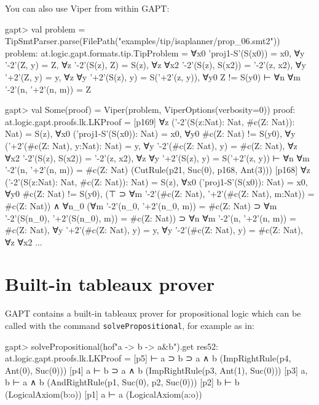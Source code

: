 \documentclass[a4paper,11pt]{book}
\begin{document}
You can also use Viper from within GAPT:
\begin{clilisting}
gapt> val problem = TipSmtParser.parse(FilePath("examples/tip/isaplanner/prop_06.smt2"))
problem: at.logic.gapt.formats.tip.TipProblem =
∀x0 'proj1-S'(S(x0)) = x0,
∀y '-2'(Z, y) = Z,
∀z '-2'(S(z), Z) = S(z),
∀z ∀x2 '-2'(S(z), S(x2)) = '-2'(z, x2),
∀y '+2'(Z, y) = y,
∀z ∀y '+2'(S(z), y) = S('+2'(z, y)),
∀y0 Z != S(y0)
⊢
∀n ∀m '-2'(n, '+2'(n, m)) = Z

gapt> val Some(proof) = Viper(problem, ViperOptions(verbosity=0))
proof: at.logic.gapt.proofs.lk.LKProof =
[p169] ∀z ('-2'(S(z:Nat): Nat, #c(Z: Nat)): Nat) = S(z),
∀x0 ('proj1-S'(S(x0)): Nat) = x0,
∀y0 #c(Z: Nat) != S(y0),
∀y ('+2'(#c(Z: Nat), y:Nat): Nat) = y,
∀y '-2'(#c(Z: Nat), y) = #c(Z: Nat),
∀z ∀x2 '-2'(S(z), S(x2)) = '-2'(z, x2),
∀z ∀y '+2'(S(z), y) = S('+2'(z, y))
⊢
∀n ∀m '-2'(n, '+2'(n, m)) = #c(Z: Nat)    (CutRule(p21, Suc(0), p168, Ant(3)))
[p168] ∀z ('-2'(S(z:Nat): Nat, #c(Z: Nat)): Nat) = S(z),
∀x0 ('proj1-S'(S(x0)): Nat) = x0,
∀y0 #c(Z: Nat) != S(y0),
(⊤ ⊃ ∀m '-2'(#c(Z: Nat), '+2'(#c(Z: Nat), m:Nat)) = #c(Z: Nat)) ∧
    ∀n_0
    (∀m '-2'(n_0, '+2'(n_0, m)) = #c(Z: Nat) ⊃
      ∀m '-2'(S(n_0), '+2'(S(n_0), m)) = #c(Z: Nat)) ⊃
  ∀n ∀m '-2'(n, '+2'(n, m)) = #c(Z: Nat),
∀y '+2'(#c(Z: Nat), y) = y,
∀y '-2'(#c(Z: Nat), y) = #c(Z: Nat),
∀z ∀x2 ...

\end{clilisting}

\section{Built-in tableaux prover}

GAPT contains a built-in tableaux prover for propositional logic
which can be called with the command \texttt{solvePropositional}, for example as in:
\begin{clilisting}
gapt> solvePropositional(hof"a -> b -> a&b").get
res52: at.logic.gapt.proofs.lk.LKProof =
[p5]  ⊢ a ⊃ b ⊃ a ∧ b    (ImpRightRule(p4, Ant(0), Suc(0)))
[p4] a ⊢ b ⊃ a ∧ b    (ImpRightRule(p3, Ant(1), Suc(0)))
[p3] a, b ⊢ a ∧ b    (AndRightRule(p1, Suc(0), p2, Suc(0)))
[p2] b ⊢ b    (LogicalAxiom(b:o))
[p1] a ⊢ a    (LogicalAxiom(a:o))

\end{clilisting}
\end{document}
